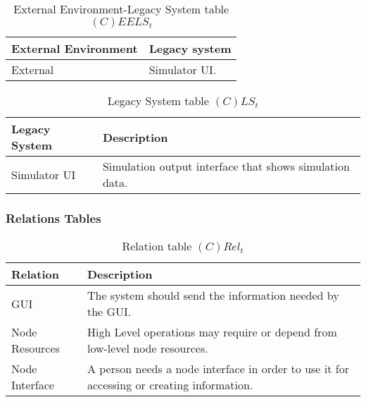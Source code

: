 \begin{table}[H]
	\centering
	\begin{tabular}{|p{4cm}|p{8cm}|}
			\hline
			\textbf{External Environment} & \textbf{Legacy system} \\
			\hline
			External & Simulator UI. \\
			\hline
		\end{tabular}
	\caption{External Environment-Legacy System table $(C)EELS_t$}
	\label{tab:ceelst}
\end{table}

\begin{table}[H]
	\centering
	\begin{tabular}{|p{4cm}|p{8cm}|}
			\hline
			\textbf{Legacy System} & \textbf{Description} \\
			\hline
			Simulator UI & Simulation output interface that shows simulation data. \\
			\hline
		\end{tabular}
	\caption{Legacy System table $(C)LS_t$}
	\label{tab:clst}
\end{table}

\subsubsection{Relations Tables}

\begin{table}[H]
	\centering
	\begin{tabular}{|p{4cm}|p{8cm}|}
			\hline
			\textbf{Relation} & \textbf{Description} \\
			\hline
			GUI & The system should send the information needed by the GUI. \\
			\hline
			Node Resources & High Level operations may require or depend from
			low-level node resources. \\
			\hline
			Node Interface & A person needs a node interface in order to use it for
			accessing or creating information. \\
			\hline
		\end{tabular}
	\caption{Relation table $(C)Rel_t$}
	\label{tab:crelt}
\end{table}

